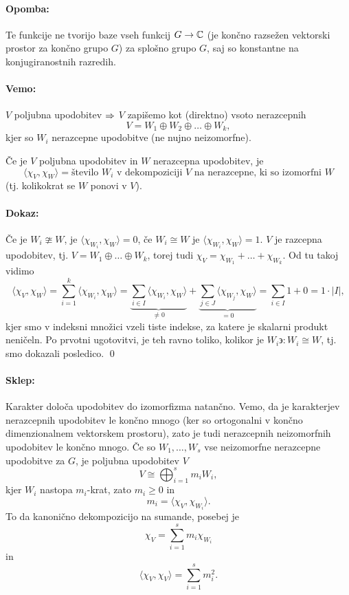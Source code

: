 \paragraph{Opomba:} Te funkcije ne tvorijo baze vseh funkcij $G \to \mathbb{C}$ (je kon\v cno razse\v zen vektorski prostor za kon\v cno grupo
$G$) za splo\v sno grupo $G$, saj so konstantne na konjugiranostnih razredih.

\paragraph{Vemo:} $V$ poljubna upodobitev $\Rightarrow$ $V$ zapi\v semo kot (direktno) vsoto nerazcepnih
\[
	V = W_1 \oplus W_2 \oplus \ldots \oplus W_k,
\]
kjer so $W_i$ nerazcepne upodobitve (ne nujno neizomorfne).

\begin{posledica}
	\v Ce je $V$ poljubna upodobitev in $W$ nerazcepna upodobitev, je
	\[
		\langle \chi_V, \chi_W \rangle = \text{\v stevilo $W_i$ v dekompoziciji $V$ na nerazcepne, ki so izomorfni $W$}
	\]
	(tj. kolikokrat se $W$ ponovi v $V$).
\end{posledica}

\paragraph{Dokaz:}
\v Ce je $W_i \ncong W$, je $\langle \chi_{W_i}, \chi_W\rangle = 0$, \v ce $W_i \cong W$ je $\langle \chi_{W_i}, \chi_W\rangle = 1$.
$V$ je razcepna upodobitev, tj. $V = W_1 \oplus \ldots \oplus W_k$, torej tudi $\chi_V = \chi_{W_1} + \ldots + \chi_{W_k}$. Od tu takoj
vidimo
\[
	\langle\chi_V,\chi_W\rangle = \sum_{i = 1}^k \langle \chi_{W_i},\chi_W\rangle = \underbrace{\sum_{i \in I}\langle
		\chi_{W_i},\chi_W\rangle}_{\neq 0} + \underbrace{\sum_{j \in J}\langle \chi_{W_j},\chi_W\rangle}_{= 0} = \sum_{i \in I} 1 +
		0 = 1 \cdot |I|,
\]
kjer smo v indeksni mno\v zici vzeli tiste indekse, za katere je skalarni produkt neni\v celn. Po prvotni ugotovitvi, je teh ravno toliko,
kolikor je $W_i \backepsilon: W_i \cong W$, tj. smo dokazali posledico.
\qed

\paragraph{Sklep:} Karakter dolo\v ca upodobitev do izomorfizma natan\v cno. Vemo, da je karakterjev nerazcepnih upodobitev le kon\v cno
mnogo (ker so ortogonalni v kon\v cno dimenzionalnem vektorskem prostoru), zato je tudi nerazcepnih neizomorfnih upodobitev le kon\v cno
mnogo. \v Ce so $W_1, \ldots, W_s$ vse neizomorfne nerazcepne upodobitve za $G$, je poljubna upodobitev $V$
\[
	V \cong \bigoplus_{i = 1}^s m_i W_i,
\]
kjer $W_i$ nastopa $m_i$-krat, zato $m_i \geq 0$ in
\[
	m_i = \langle \chi_V, \chi_{W_i} \rangle.
\]
To da kanoni\v cno dekompozicijo na sumande, posebej je
\[
	\chi_V = \sum_{i = 1}^s m_i \chi_{W_i}
\]
in
\[
	\langle \chi_V, \chi_V \rangle = \sum_{i = 1}^s m_i^2.
\]


